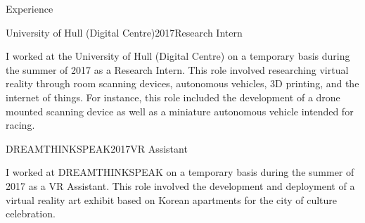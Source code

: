 \documentclass{cv}
\begin{document}
\begin{rSection}{Experience}
        \item \begin{rSubsection}{University of Hull (Digital Centre)}{2017}{Research Intern}{}
            \item I worked at the University of Hull (Digital Centre) on a temporary basis during the summer of 2017 as a Research Intern. This role involved researching virtual reality through room scanning devices, autonomous vehicles, 3D printing, and the internet of things. For instance, this role included the development of a drone mounted scanning device as well as a miniature autonomous vehicle intended for racing.
        \end{rSubsection}
        
        \item \begin{rSubsection}{DREAMTHINKSPEAK}{2017}{VR Assistant}{}
            \item I worked at DREAMTHINKSPEAK on a temporary basis during the summer of 2017 as a VR Assistant. This role involved the development and deployment of a virtual reality art exhibit based on Korean apartments for the city of culture celebration.
        \end{rSubsection}
    \end{rSection}

    \newpage
    
\end{document}
